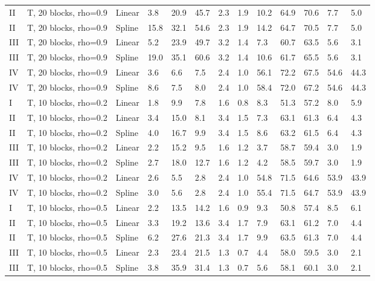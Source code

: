 \documentclass{article}\usepackage[]{graphicx}\usepackage[]{color}
\begin{document}
\begin{table}[ht]
\begin{tabular}{lll|lllll|lllll}
  II & T, 20 blocks, rho=0.9 & Linear & 3.8 & 20.9 & 45.7 & 2.3 & 1.9 & 10.2 & 64.9 & 70.6 & 7.7 & 5.0 \\ 
  II & T, 20 blocks, rho=0.9 & Spline & 15.8 & 32.1 & 54.6 & 2.3 & 1.9 & 14.2 & 64.7 & 70.5 & 7.7 & 5.0 \\ 
  III & T, 20 blocks, rho=0.9 & Linear & 5.2 & 23.9 & 49.7 & 3.2 & 1.4 & 7.3 & 60.7 & 63.5 & 5.6 & 3.1 \\ 
  III & T, 20 blocks, rho=0.9 & Spline & 19.0 & 35.1 & 60.6 & 3.2 & 1.4 & 10.6 & 61.7 & 65.5 & 5.6 & 3.1 \\ 
  IV & T, 20 blocks, rho=0.9 & Linear & 3.6 & 6.6 & 7.5 & 2.4 & 1.0 & 56.1 & 72.2 & 67.5 & 54.6 & 44.3 \\ 
  IV & T, 20 blocks, rho=0.9 & Spline & 8.6 & 7.5 & 8.0 & 2.4 & 1.0 & 58.4 & 72.0 & 67.2 & 54.6 & 44.3 \\ 
   \hline
I & T, 10 blocks, rho=0.2 & Linear & 1.8 & 9.9 & 7.8 & 1.6 & 0.8 & 8.3 & 51.3 & 57.2 & 8.0 & 5.9 \\ 
  II & T, 10 blocks, rho=0.2 & Linear & 3.4 & 15.0 & 8.1 & 3.4 & 1.5 & 7.3 & 63.1 & 61.3 & 6.4 & 4.3 \\ 
  II & T, 10 blocks, rho=0.2 & Spline & 4.0 & 16.7 & 9.9 & 3.4 & 1.5 & 8.6 & 63.2 & 61.5 & 6.4 & 4.3 \\ 
  III & T, 10 blocks, rho=0.2 & Linear & 2.2 & 15.2 & 9.5 & 1.6 & 1.2 & 3.7 & 58.7 & 59.4 & 3.0 & 1.9 \\ 
  III & T, 10 blocks, rho=0.2 & Spline & 2.7 & 18.0 & 12.7 & 1.6 & 1.2 & 4.2 & 58.5 & 59.7 & 3.0 & 1.9 \\ 
  IV & T, 10 blocks, rho=0.2 & Linear & 2.6 & 5.5 & 2.8 & 2.4 & 1.0 & 54.8 & 71.5 & 64.6 & 53.9 & 43.9 \\ 
  IV & T, 10 blocks, rho=0.2 & Spline & 3.0 & 5.6 & 2.8 & 2.4 & 1.0 & 55.4 & 71.5 & 64.7 & 53.9 & 43.9 \\ 
   \hline
I & T, 10 blocks, rho=0.5 & Linear & 2.2 & 13.5 & 14.2 & 1.6 & 0.9 & 9.3 & 50.8 & 57.4 & 8.5 & 6.1 \\ 
  II & T, 10 blocks, rho=0.5 & Linear & 3.3 & 19.2 & 13.6 & 3.4 & 1.7 & 7.9 & 63.1 & 61.2 & 7.0 & 4.4 \\ 
  II & T, 10 blocks, rho=0.5 & Spline & 6.2 & 27.6 & 21.3 & 3.4 & 1.7 & 9.9 & 63.5 & 61.3 & 7.0 & 4.4 \\ 
  III & T, 10 blocks, rho=0.5 & Linear & 2.3 & 23.4 & 21.5 & 1.3 & 0.7 & 4.4 & 58.0 & 59.5 & 3.0 & 2.1 \\ 
  III & T, 10 blocks, rho=0.5 & Spline & 3.8 & 35.9 & 31.4 & 1.3 & 0.7 & 5.6 & 58.1 & 60.1 & 3.0 & 2.1 \\ 

\end{tabular}
\end{table}
\end{document}
